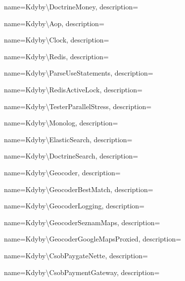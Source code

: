  {
  name={K\-dy\-by\textbackslash{}\-Doc\-tri\-ne\-Mo\-ney},
  description={} }

 {
  name={K\-dy\-by\textbackslash{}\-Aop},
  description={} }

 {
  name={K\-dy\-by\textbackslash{}\-Clo\-ck},
  description={} }

 {
  name={K\-dy\-by\textbackslash{}\-Re\-di\-s},
  description={} }

 {
  name={K\-dy\-by\textbackslash{}\-Par\-se\-Use\-Sta\-te\-men\-ts},
  description={} }

 {
  name={K\-dy\-by\textbackslash{}\-Re\-dis\-Acti\-ve\-Lock},
  description={} }

 {
  name={K\-dy\-by\textbackslash{}\-Tes\-ter\-Pa\-ra\-ll\-el\-St\-ress},
  description={} }

 {
  name={K\-dy\-by\textbackslash{}\-Mo\-no\-log},
  description={} }

 {
  name={K\-dy\-by\textbackslash{}\-Elastic\-Sear\-ch},
  description={} }

 {
  name={K\-dy\-by\textbackslash{}\-Doc\-tri\-ne\-Sear\-ch},
  description={} }

 {
  name={K\-dy\-by\textbackslash{}\-Geo\-co\-der},
  description={} }

 {
  name={K\-dy\-by\textbackslash{}\-Geo\-co\-der\-Be\-st\-Ma\-tch},
  description={} }

 {
  name={K\-dy\-by\textbackslash{}\-Geo\-co\-der\-Log\-g\-ing},
  description={} }

 {
  name={K\-dy\-by\textbackslash{}\-Geo\-co\-der\-Se\-z\-nam\-Ma\-ps},
  description={} }

 {
  name={K\-dy\-by\textbackslash{}\-Geo\-co\-der\-Goo\-gle\-Ma\-ps\-Pro\-xi\-ed},
  description={} }

 {
  name={K\-dy\-by\textbackslash{}\-C\-s\-o\-b\-Pay\-ga\-te\-Ne\-tte},
  description={} }

 {
  name={K\-dy\-by\textbackslash{}\-C\-s\-o\-b\-Pay\-me\-nt\-Ga\-te\-way},
  description={} }


